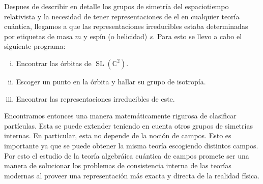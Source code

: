 \documentclass[11pt]{article}
\DeclareMathOperator{\Sl}{SL}
\begin{document}
Despues de describir en detalle los grupos de simetría del espaciotiempo relativista y la necesidad de tener representaciones de el en cualquier teoría cuántica, llegamos a que las representaciones irreducibles estaba determinadas por etiquetas de masa $m$ y espín (o helicidad) $s$. Para esto se llevo a cabo el siguiente programa\cite{Sternberg1994}:
\begin{enumerate}[(i)]
\item Encontrar las órbitas de $\Sl(\mathbb{C}^2)$.
\item Escoger un punto en la órbita y hallar su grupo de isotropía.
\item Encontrar las representaciones irreducibles de este.
\end{enumerate}

Encontramos entonces una manera matemáticamente rigurosa de clasificar partículas. Esta se puede extender teniendo en cuenta otros grupos de simetrías internas. En particular, esta no depende de la noción de campos. Esto es importante ya que se puede obtener la misma teoría escogiendo distintos campos. Por esto el estudio de la teoría algebráica cuántica de campos promete ser una manera de solucionar los problemas de consistencia interna de las teorías modernas al proveer una representación más exacta y directa de la realidad física\cite{Haag1992}.



\end{document}
